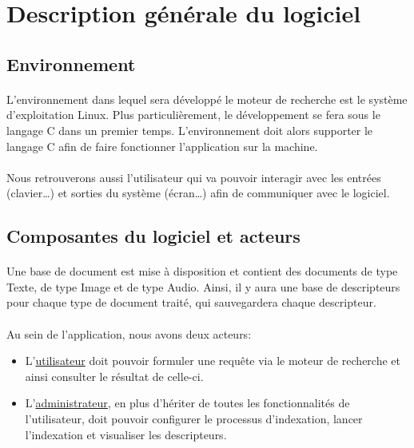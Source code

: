 \documentclass[../main.tex]{subfiles}
\begin{document}
    \section{Description générale du logiciel}
    \subsection{Environnement}

    \paragraph{}
    L’environnement dans lequel sera développé le moteur de recherche est le système d’exploitation Linux. Plus particulièrement, le développement se fera sous le langage C dans un premier temps. L’environnement doit alors supporter le langage C afin de faire fonctionner l’application sur la machine.

    \paragraph{}
    Nous retrouverons aussi l’utilisateur qui va pouvoir interagir avec les entrées (clavier…) et sorties du système (écran…) afin de communiquer avec le logiciel.

    \subsection{Composantes du logiciel et acteurs}

    \paragraph{}
    Une base de document est mise à disposition et contient des documents de type Texte, de type Image et de type Audio. Ainsi, il y aura une base de descripteurs pour chaque type de document traité, qui sauvegardera chaque descripteur.

    \paragraph{}
    Au sein de l’application, nous avons deux acteurs:
    \begin{itemize}
        \item L’\underline{utilisateur} doit pouvoir formuler une requête via le moteur de recherche et ainsi consulter le résultat de celle-ci.
        \item L’\underline{administrateur}, en plus d’hériter de toutes les fonctionnalités de l’utilisateur, doit pouvoir configurer le processus d’indexation, lancer l’indexation et visualiser les descripteurs.
    \end{itemize}
\end{document}
